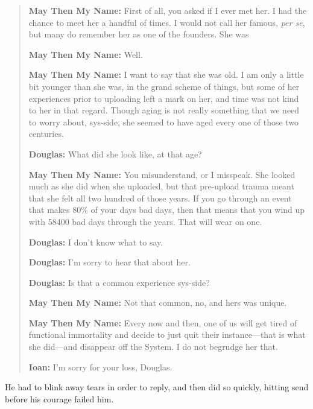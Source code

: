 \begin{quote}
\textbf{May Then My Name:} First of all, you asked if I ever met her. I had the chance to meet her a handful of times. I would not call her famous, \emph{per se}, but many do remember her as one of the founders. She was

\textbf{May Then My Name:} Well.

\textbf{May Then My Name:} I want to say that she was old. I am only a little bit younger than she was, in the grand scheme of things, but some of her experiences prior to uploading left a mark on her, and time was not kind to her in that regard. Though aging is not really something that we need to worry about, sys-side, she seemed to have aged every one of those two centuries.

\textbf{Douglas:} What did she look like, at that age?

\textbf{May Then My Name:} You misunderstand, or I misspeak. She looked much as she did when she uploaded, but that pre-upload trauma meant that she felt all two hundred of those years. If you go through an event that makes 80\% of your days bad days, then that means that you wind up with 58400 bad days through the years. That will wear on one.

\textbf{Douglas:} I don't know what to say.

\textbf{Douglas:} I'm sorry to hear that about her.

\textbf{Douglas:} Is that a common experience sys-side?

\textbf{May Then My Name:} Not that common, no, and hers was unique.

\textbf{May Then My Name:} Every now and then, one of us will get tired of functional immortality and decide to just quit their instance---that is what she did---and disappear off the System. I do not begrudge her that.

\textbf{Ioan:} I'm sorry for your loss, Douglas.
\end{quote}

\noindent He had to blink away tears in order to reply, and then did so quickly, hitting send before his courage failed him.

